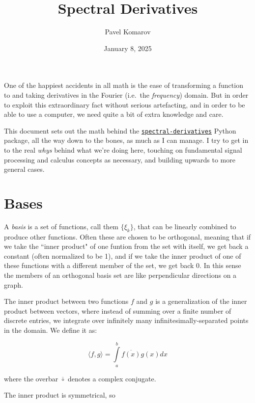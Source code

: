 \documentclass[10pt]{article}
\begin{document}
\allowdisplaybreaks

\title{Spectral Derivatives}
\author{Pavel Komarov}
\date{January 8, 2025}
\maketitle

One of the happiest accidents in all math is the ease of transforming a function to and taking derivatives in the Fourier (i.e.~the \textit{frequency}) domain. But in order to exploit this extraordinary fact without serious artefacting, and in order to be able to use a computer, we need quite a bit of extra knowledge and care.

This document sets out the math behind the \href{https://pypi.org/project/spectral-derivatives/}{\texttt{spectral-derivatives}} Python package, all the way down to the bones, as much as I can manage. I try to get in to the real \textit{whys} behind what we're doing here, touching on fundamental signal processing and calculus concepts as necessary, and building upwards to more general cases.

\small
\tableofcontents
\normalsize

\section{Bases}

A \textit{basis} is a set of functions, call them $\{\xi_k\}$, that can be linearly combined to produce other functions. Often these are chosen to be orthogonal, meaning that if we take the ``inner product" of one funtion from the set with itself, we get back a constant (often normalized to be 1), and if we take the inner product of one of these functions with a different member of the set, we get back 0. In this sense the members of an orthogonal basis set are like perpendicular directions on a graph.

The inner product between two functions $f$ and $g$ is a generalization of the inner product between vectors, where instead of summing over a finite number of discrete entries, we integrate over infinitely many infinitesimally-separated points in the domain. We define it as:

$$ \langle f,g \rangle = \int\limits_{a}^{b} \overline{f(x)} g(x) dx $$

\noindent where the overbar $\overline{\circ}$ denotes a complex conjugate.

The inner product is symmetrical, so
\end{document}

